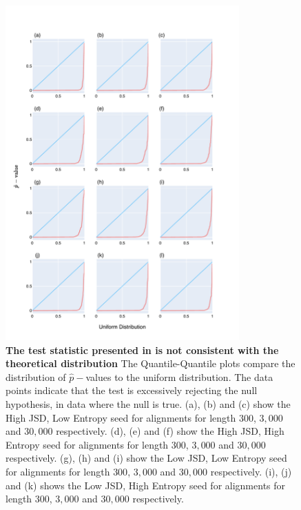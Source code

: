 \begin{figure}[!ht]
\centering
\includegraphics[width=0.8\textwidth]{figures/plots/synthetic/chi2/all_seeds.pdf}
\caption[The test statistic presented in \cite{Squartini2008QuantifyingProcess} is not consistent with the theoretical distribution]{\textbf{The test statistic presented in \cite{Squartini2008QuantifyingProcess} is not consistent with the theoretical distribution} The Quantile-Quantile plots compare the distribution of $\hat p-$values to the uniform distribution. The data points indicate that the test is excessively rejecting the null hypothesis, in data where the null is true. (a), (b) and (c) show the High JSD, Low Entropy seed for alignments for length $300$, $3,000$ and $30,000$ respectively. (d), (e) and (f) show the High JSD, High Entropy seed for alignments for length $300$, $3,000$ and $30,000$ respectively. (g), (h) and (i) show the Low JSD, Low Entropy seed for alignments for length $300$, $3,000$ and $30,000$ respectively. (i), (j) and (k) shows the Low JSD, High Entropy seed for alignments for length $300$, $3,000$ and $30,000$ respectively.}
\label{fig:synthetic/chi2/all-seeds}
\end{figure}